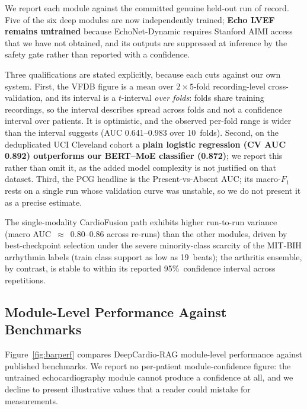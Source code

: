 \documentclass[AMA,STIX1COL,]{WileyNJD-v2}
\begin{document}
We report each module against the committed genuine held-out run of
record. Five of the six deep modules are now independently trained;
\textbf{Echo LVEF remains untrained} because EchoNet-Dynamic requires
Stanford AIMI access that we have not obtained, and its outputs are
suppressed at inference by the safety gate rather than reported with a
confidence.

Three qualifications are stated explicitly, because each cuts against
our own system. First, the VFDB figure is a mean over
$2\times5$-fold recording-level cross-validation, and its interval is a
$t$-interval \emph{over folds}: folds share training recordings, so the
interval describes spread across folds and not a confidence interval
over patients. It is optimistic, and the observed per-fold range is
wider than the interval suggests (AUC 0.641--0.983 over 10~folds).
Second, on the deduplicated UCI Cleveland cohort a
\textbf{plain logistic regression (CV AUC 0.892) outperforms our
BERT--MoE classifier (0.872)}; we report this rather than omit it, as
the added model complexity is not justified on that dataset. Third, the
PCG headline is the Present-vs-Absent AUC; its macro-$F_1$ rests on a
single run whose validation curve was unstable, so we do not present it
as a precise estimate.

The single-modality CardioFusion path exhibits higher
run-to-run variance (macro AUC~$\approx$~0.80--0.86 across
re-runs) than the other modules, driven by best-checkpoint
selection under the severe minority-class scarcity of the MIT-BIH
arrhythmia labels (train class support as low as 19~beats); the
arthritis ensemble, by contrast, is stable to within its reported
95\%~confidence interval across repetitions.

\subsection{Module-Level Performance Against Benchmarks}

Figure~\ref{fig:barperf} compares DeepCardio-RAG module-level
performance against published benchmarks. We report no per-patient
module-confidence figure: the untrained echocardiography module cannot
produce a confidence at all, and we decline to present illustrative
values that a reader could mistake for measurements.
\end{document}
